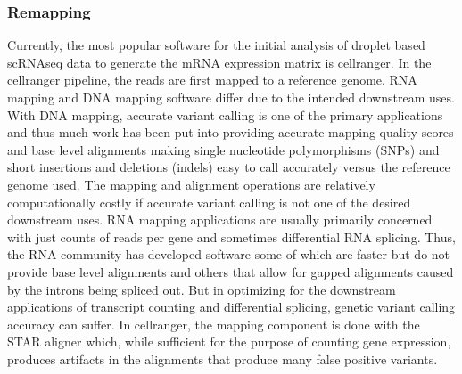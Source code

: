 \subsubsection{Remapping}
\par{
Currently, the most popular software for the initial analysis of droplet based scRNAseq data to generate the mRNA expression matrix is cellranger\cite{10xsinglecell}. In the cellranger pipeline, the reads are first mapped to a reference genome. RNA mapping and DNA mapping software differ due to the intended downstream uses. With DNA mapping, accurate variant calling is one of the primary applications and thus much work has been put into providing accurate mapping quality scores and base level alignments making single nucleotide polymorphisms (SNPs) and short insertions and deletions (indels) easy to call accurately versus the reference genome used\cite{bwa}\cite{minimap2}\cite{bowtie}\cite{freebayes}\cite{gatk}. The mapping and alignment operations are relatively computationally costly if accurate variant calling is not one of the desired downstream uses. RNA mapping applications are usually primarily concerned with just counts of reads per gene and sometimes differential RNA splicing. Thus, the RNA community has developed software some of which are faster but do not provide base level alignments\cite{kallisto}\cite{salmon} and others that allow for gapped alignments caused by the introns being spliced out\cite{bowtie2}\cite{STAR}\cite{hisat}\cite{tophat}. But in optimizing for the downstream applications of transcript counting and differential splicing, genetic variant calling accuracy can suffer. In cellranger, the mapping component is done with the STAR aligner\cite{STAR} which, while sufficient for the purpose 
of counting gene expression, produces artifacts in the alignments that produce many false positive variants. 
} 
